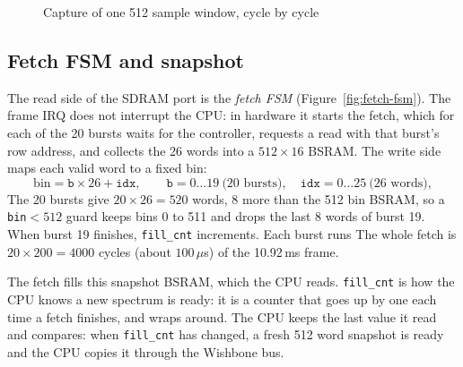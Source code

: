 \documentclass[a4paper,10pt]{article}
\begin{document}
\begin{figure}[H]
{%
}
\caption{Capture of one 512 sample window, cycle by cycle}
\label{fig:pipeline}
\end{figure}

\subsection{Fetch FSM and snapshot}
\label{sec:fetch}

The read side of the SDRAM port is the \emph{fetch FSM}
(Figure~\ref{fig:fetch-fsm}). The frame IRQ does not interrupt the CPU: in hardware
it starts the fetch, which for each of the 20 bursts waits for the controller,
requests a read with that burst's row address, and collects the 26 words into a
$512\times16$ BSRAM. The write side maps each valid word to a fixed bin:
\[
\text{bin} = \texttt{b}\times26 + \texttt{idx}, \qquad
\texttt{b}=0\ldots19\ \text{(20 bursts)}, \quad
\texttt{idx}=0\ldots25\ \text{(26 words)},
\]
The 20 bursts give $20\times26=520$ words, 8 more than
the 512 bin BSRAM, so a \texttt{bin}$<512$ guard keeps bins 0 to 511 and drops the last 8
words of burst 19. When burst 19 finishes, \texttt{fill\_cnt} increments. Each burst runs
The whole fetch is $20\times200=4000$ cycles (about
$100\,\mu$s) of the 10.92\,ms frame.

The fetch fills this snapshot BSRAM, which the CPU reads.
\texttt{fill\_cnt} is how the CPU knows a new spectrum is ready: it is a counter that
goes up by one each time a fetch finishes, and wraps around.
The CPU keeps the last value it read and
compares: when \texttt{fill\_cnt} has changed, a fresh 512 word snapshot is ready and
the CPU copies it through the Wishbone bus.
\end{document}
